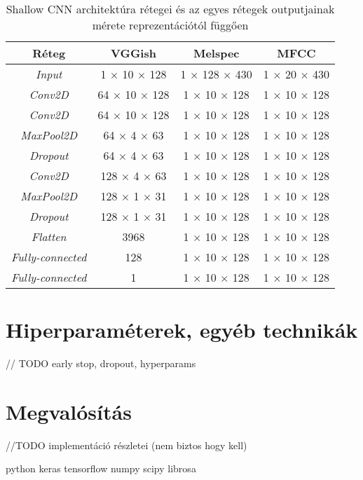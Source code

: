 \begin{table}[H]
	\centering
	\begin{tabular}{ | c | c | c | c |}
		\hline
		\textbf{Réteg} & \textbf{VGGish} & \textbf{Melspec}& \textbf{MFCC}  \\
		\hline \hline
		\emph{Input} & 1 $\times$ 10 $\times$ 128 & 1 $\times$ 128 $\times$ 430 & 1 $\times$ 20 $\times$ 430 \\
		\hline
		\emph{Conv2D} & 64 $\times$ 10 $\times$ 128 & 1 $\times$ 10 $\times$ 128 & 1 $\times$ 10 $\times$ 128 \\
		\hline
		\emph{Conv2D} & 64 $\times$ 10 $\times$ 128 & 1 $\times$ 10 $\times$ 128 & 1 $\times$ 10 $\times$ 128 \\
		\hline
		\emph{MaxPool2D} & 64 $\times$ 4 $\times$ 63 & 1 $\times$ 10 $\times$ 128 & 1 $\times$ 10 $\times$ 128 \\
		\hline
		\emph{Dropout} & 64 $\times$ 4 $\times$ 63 & 1 $\times$ 10 $\times$ 128 & 1 $\times$ 10 $\times$ 128 \\
		\hline 
		\emph{Conv2D} & 128 $\times$ 4 $\times$ 63 & 1 $\times$ 10 $\times$ 128 & 1 $\times$ 10 $\times$ 128 \\
		\hline
		\emph{MaxPool2D} & 128 $\times$ 1 $\times$ 31 & 1 $\times$ 10 $\times$ 128 & 1 $\times$ 10 $\times$ 128 \\
		\hline
		\emph{Dropout} & 128 $\times$ 1 $\times$ 31 & 1 $\times$ 10 $\times$ 128 & 1 $\times$ 10 $\times$ 128 \\
		\hline
		\emph{Flatten} & 3968 & 1 $\times$ 10 $\times$ 128 & 1 $\times$ 10 $\times$ 128 \\
		\hline
		\emph{Fully-connected} & 128 & 1 $\times$ 10 $\times$ 128 & 1 $\times$ 10 $\times$ 128 \\
		\hline
		\emph{Fully-connected} & 1 & 1 $\times$ 10 $\times$ 128 & 1 $\times$ 10 $\times$ 128 \\
		\hline
	\end{tabular}
	\caption{Shallow CNN architektúra rétegei és az egyes rétegek outputjainak mérete reprezentációtól függően}
	\label{tab:scnn}
\end{table}

\section{Hiperparaméterek, egyéb technikák}

// TODO  early stop, dropout, hyperparams

\section{Megvalósítás}

//TODO implementáció részletei (nem biztos hogy kell)

python keras tensorflow numpy scipy librosa 